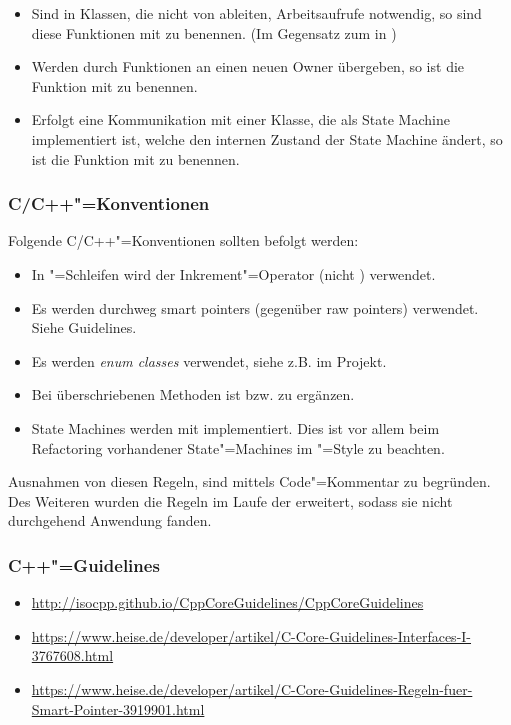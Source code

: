 \begin{itemize}
	\item Sind in Klassen, die nicht von  ableiten, Arbeitsaufrufe notwendig, so sind diese Funktionen mit  zu benennen. (Im Gegensatz zum  in )
	\item Werden  durch Funktionen an einen neuen Owner übergeben, so ist die Funktion mit  zu benennen.
	\item Erfolgt eine Kommunikation mit einer Klasse, die als State Machine implementiert ist, welche den internen Zustand der State Machine ändert, so ist die Funktion mit  zu benennen.
\end{itemize}

\subsubsection{C/C++"=Konventionen}
Folgende C/C++"=Konventionen sollten befolgt werden:

\begin{itemize}
	\item In "=Schleifen wird der Inkrement"=Operator  (nicht ) verwendet.
	\item Es werden durchweg smart pointers (gegenüber raw pointers) verwendet. Siehe Guidelines.
	\item Es werden \textit{enum classes} verwendet, siehe z.B.  im Projekt.
	\item Bei überschriebenen Methoden ist  bzw.  zu ergänzen.
	\item State Machines werden mit  implementiert. Dies ist vor allem beim Refactoring vorhandener State"=Machines im "=Style zu beachten.
\end{itemize}

Ausnahmen von diesen Regeln, sind mittels Code"=Kommentar zu begründen.
Des Weiteren wurden die Regeln im Laufe der \pg erweitert, sodass sie nicht durchgehend Anwendung fanden.

\subsubsection{C++"=Guidelines}
\begin{itemize}
	\item \url{http://isocpp.github.io/CppCoreGuidelines/CppCoreGuidelines}
	\item \url{https://www.heise.de/developer/artikel/C-Core-Guidelines-Interfaces-I-3767608.html}
	\item \url{https://www.heise.de/developer/artikel/C-Core-Guidelines-Regeln-fuer-Smart-Pointer-3919901.html}
\end{itemize}

